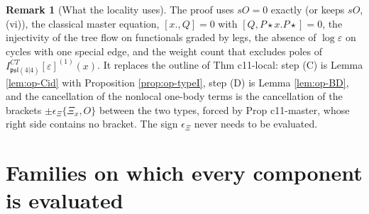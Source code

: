 \documentclass[11pt]{article}
\numberwithin{equation}{section}
\theoremstyle{plain}
\theoremstyle{definition}
\newtheorem{remark}[theorem]{Remark}
\newcommand{\psl}{\mathfrak{psl}(4|4)}
\newcommand{\Pst}{P\star}
\begin{document}
\begin{remark}[What the locality uses]
\label{rem:op-localuses}
The proof uses $sO=0$ exactly (or keeps $sO$, (vi)), the classical master equation, $[x.,Q]=0$ with $[Q,\Pst x.\Pst]=0$, the injectivity of the tree flow on functionals graded by legs, the absence of $\log\varepsilon$ on cycles with one special edge, and the weight count that excludes poles of $I^{CT}_{\psl}[\varepsilon]^{(1)}(x)$. It replaces the outline of Thm c11-local: step (C) is Lemma \ref{lem:op-Cid} with Proposition \ref{prop:op-typeI}, step (D) is Lemma \ref{lem:op-BD}, and the cancellation of the nonlocal one-body terms is the cancellation of the brackets $\pm\epsilon_\Xi\{\Xi_x,O\}$ between the two types, forced by Prop c11-master, whose right side contains no bracket. The sign $\epsilon_\Xi$ never needs to be evaluated.
\end{remark}

\section{Families on which every component is evaluated}
\label{sec:op-families}
\end{document}
